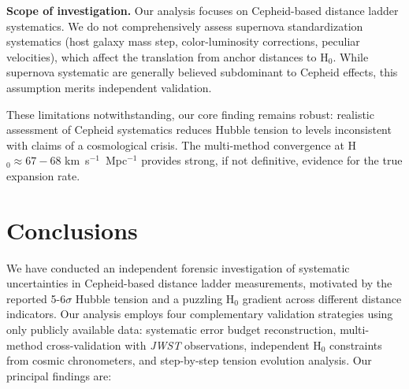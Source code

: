 \documentclass[twocolumn, linenumbers]{aastex701}
\begin{document}
\textbf{Scope of investigation.} Our analysis focuses on Cepheid-based distance ladder systematics. We do not comprehensively assess supernova standardization systematics (host galaxy mass step, color-luminosity corrections, peculiar velocities), which affect the translation from anchor distances to H$_0$. While supernova systematic are generally believed subdominant to Cepheid effects, this assumption merits independent validation.

These limitations notwithstanding, our core finding remains robust: realistic assessment of Cepheid systematics reduces Hubble tension to levels inconsistent with claims of a cosmological crisis. The multi-method convergence at H$_0 \approx 67-68$ km~s$^{-1}$~Mpc$^{-1}$ provides strong, if not definitive, evidence for the true expansion rate.


\section{Conclusions} \label{sec:conclusions}

We have conducted an independent forensic investigation of systematic uncertainties in Cepheid-based distance ladder measurements, motivated by the reported 5-6$\sigma$ Hubble tension and a puzzling H$_0$ gradient across different distance indicators. Our analysis employs four complementary validation strategies using only publicly available data: systematic error budget reconstruction, multi-method cross-validation with \textit{JWST} observations, independent H$_0$ constraints from cosmic chronometers, and step-by-step tension evolution analysis. Our principal findings are:
\end{document}
